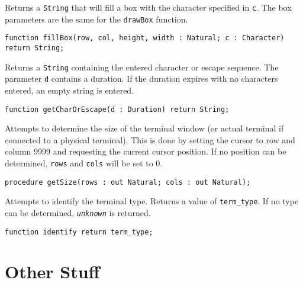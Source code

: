 \documentclass[10pt, openany]{book}
\newcommand{\function}[1]{\texttt{#1}}
\newcommand{\constant}[1]{\emph{\texttt{#1}}}
\newcommand{\keyword}[1]{\texttt{#1}}
\newcommand{\datatype}[1]{\texttt{#1}}
\newcommand{\comment}[1]{{\color{red}{#1}}}
\begin{document}
Returns a \datatype{String} that will fill a box with the character specified in \keyword{c}.  The box parameters are the same for the \function{drawBox} function.
\begin{lstlisting}
function fillBox(row, col, height, width : Natural; c : Character) return String;
\end{lstlisting}

Returns a \datatype{String} containing the entered character or escape sequence.  The parameter \keyword{d} contains a duration.  If the duration expires with no characters entered, an empty string is entered.
\begin{lstlisting}
function getCharOrEscape(d : Duration) return String;
\end{lstlisting}

Attempts to determine the size of the terminal window (or actual terminal if connected to a physical terminal).  This is done by setting the cursor to row and column 9999 and requesting the current cursor position.  If no position can be determined, \keyword{rows} and \keyword{cols} will be set to 0.
\begin{lstlisting}
procedure getSize(rows : out Natural; cols : out Natural);
\end{lstlisting}

Attempts to identify the terminal type.  Returns a value of \datatype{term\_type}.  If no type can be determined, \constant{unknown} is returned.
\begin{lstlisting}
function identify return term_type;
\end{lstlisting}

\chapter{Other Stuff}
\comment{If there is anything else that should be added, additional chapters may be added as needed.}

\clearpage
%
%
\printindex[type]
\printindex[func]
%
%
\nocite{Ada95}
\nocite{Ada2012}
\nocite{Ada2022}
\nocite{xTerm}


\end{document}
